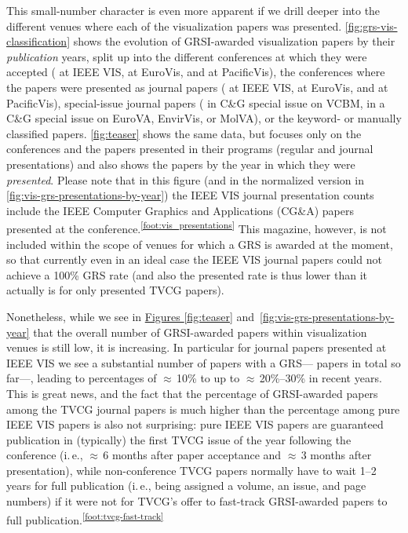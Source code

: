 \documentclass[conference]{vgtc}                     %
\newcommand{\ie}{i.\,e.}
\begin{document}
This small-number character is even more apparent if we drill deeper into the different venues where each of the visualization papers was presented. \autoref{fig:grs-vis-classification} shows the evolution of GRSI-awarded visualization papers by their \emph{publication} years, split up into the different conferences at which they were accepted (\GrsiIeeeVisPapersCount{} at IEEE VIS, \GrsiEuroVisPapersCount{} at EuroVis, and \GrsiPacificVisTvcgPapersCount{} at PacificVis), the conferences where the papers were presented as journal papers (\GrsiIeeeVisTvcgJournalPresentationsCount{} at IEEE VIS, \GrsiEuroVisJournalPresentationsCount{} at EuroVis, and \GrsiPacificVisJournalPresentationsCount{} at PacificVis), special-issue journal papers (\GrsiVcbmCagPapersCount{} in C\&G special issue on VCBM, \GrsiCagSpecialIssuesPapersCount{} in a C\&G special issue on EuroVA, EnvirVis, or MolVA), or the \GrsiVisKeywordPlusManualPapersCount{} keyword- or manually classified papers. \autoref{fig:teaser} shows the same data, but focuses only on the conferences and the papers presented in their programs (regular and journal presentations) and also shows the papers by the year in which they were \emph{presented}. Please note that in this figure (and in the normalized version in \autoref{fig:vis-grs-presentations-by-year}) the IEEE VIS journal presentation counts include the IEEE Computer Graphics and Applications (CG\&A) papers presented at the conference.\textsuperscript{\ref{foot:vis_presentations}} This magazine, however, is not included within the scope of venues for which a GRS is awarded at the moment, so that currently even in an ideal case the IEEE VIS journal papers could not achieve a 100\% GRS rate (and also the presented rate is thus lower than it actually is for only presented TVCG papers).

Nonetheless, while we see in \hyperref[fig:teaser]{Figures \ref{fig:teaser}} and~\ref{fig:vis-grs-presentations-by-year} that the overall number of GRSI-awarded papers within visualization venues is still low, it is increasing. In particular for journal papers presented at IEEE VIS we see a substantial number of papers with a GRS---\GrsiIeeeVisTvcgJournalPresentationsCount{} papers in total so far---, leading to percentages of $\approx$\,10\% to up to $\approx$\,20\%--30\% in recent years. This is great news, and the fact that the percentage of GRSI-awarded papers among the TVCG journal papers is much higher than the percentage among pure IEEE VIS papers is also not surprising: pure IEEE VIS papers are guaranteed publication in (typically) the first TVCG issue of the year following the conference (\ie, $\approx$\,6 months after paper acceptance and $\approx$\,3 months after presentation), while non-con\-fe\-rence TVCG papers normally have to wait 1--2 years for full publication (\ie, being assigned a volume, an issue, and page numbers) if it were not for TVCG's offer to fast-track GRSI-awarded papers to full publication.\textsuperscript{\ref{foot:tvcg-fast-track}}
\end{document}
